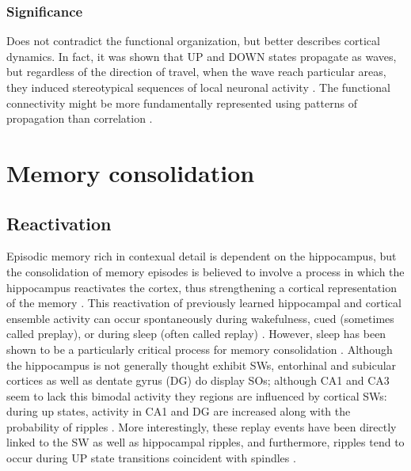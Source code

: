 \subsubsection*{Significance}
Does not contradict the functional organization, but better describes cortical dynamics. In fact, it was shown that UP and DOWN states propagate as waves, but regardless of the direction of travel, when the wave reach particular areas, they induced stereotypical sequences of local neuronal activity \citep{Luczak2007}. The functional connectivity might be more fundamentally represented using patterns of propagation than correlation  \citep{Muller2018,Mitra2018a}.


\section*{Memory consolidation}

\subsection*{Reactivation}
Episodic memory rich in contexual detail is dependent on the hippocampus, but the consolidation of memory episodes is believed to involve a process in which the hippocampus reactivates the cortex, thus strengthening a cortical representation of the memory \citep{SCOVILLE1957,Squire2004,Yassa2013}. This reactivation of previously learned hippocampal and cortical ensemble activity can occur spontaneously during wakefulness, cued (sometimes called preplay), or during sleep (often called replay) \citep{Pavlides1989,Skaggs1996,Diba2007}. However, sleep has been shown to be a particularly critical process for memory consolidation \citep{Walker2004,Abel2013}. Although the hippocampus is not generally thought exhibit SWs, entorhinal and subicular cortices as well as dentate gyrus (DG) do display SOs; although CA1 and CA3 seem to lack this bimodal activity they regions are influenced by cortical SWs: during up states, activity in CA1 and DG are increased along with the probability of ripples \citep{Isomura2006}. More interestingly, these replay events have been directly linked to the SW as well as hippocampal ripples, and furthermore, ripples tend to occur during UP state transitions coincident with spindles \citep{Siapas1998, Battaglia2004, Molle2006, Johnson2010}.

